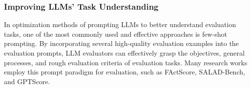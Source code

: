 \subsubsection{\textbf{Improving LLMs' Task Understanding}}
\label{subsubsec:design_input}

In optimization methods of prompting LLMs to better understand evaluation tasks, one of the most commonly used and effective approaches is few-shot prompting\cite{brown2020language}. By incorporating several high-quality evaluation examples into the evaluation prompts, LLM evaluators can effectively grasp the objectives, general processes, and rough evaluation criteria of evaluation tasks. Many research works employ this prompt paradigm for evaluation, such as FActScore\cite{min2023factscore}, SALAD-Bench\cite{salad_bench}, and GPTScore\cite{fu2024gptscore}.

